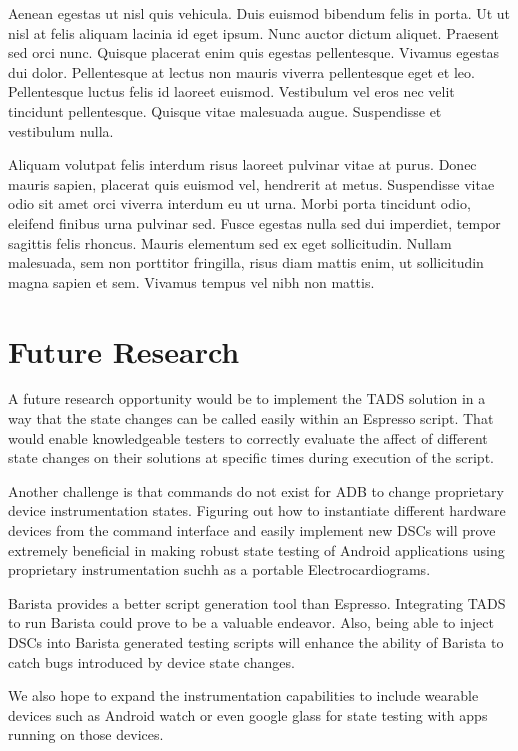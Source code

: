 Aenean egestas ut nisl quis vehicula. Duis euismod bibendum felis in porta. Ut ut nisl at felis aliquam lacinia id eget ipsum. Nunc auctor dictum aliquet. Praesent sed orci nunc. Quisque placerat enim quis egestas pellentesque. Vivamus egestas dui dolor. Pellentesque at lectus non mauris viverra pellentesque eget et leo. Pellentesque luctus felis id laoreet euismod. Vestibulum vel eros nec velit tincidunt pellentesque. Quisque vitae malesuada augue. Suspendisse et vestibulum nulla.

Aliquam volutpat felis interdum risus laoreet pulvinar vitae at purus. Donec mauris sapien, placerat quis euismod vel, hendrerit at metus. Suspendisse vitae odio sit amet orci viverra interdum eu ut urna. Morbi porta tincidunt odio, eleifend finibus urna pulvinar sed. Fusce egestas nulla sed dui imperdiet, tempor sagittis felis rhoncus. Mauris elementum sed ex eget sollicitudin. Nullam malesuada, sem non porttitor fringilla, risus diam mattis enim, ut sollicitudin magna sapien et sem. Vivamus tempus vel nibh non mattis.

\section{Future Research}
A future research opportunity would be to implement the TADS solution in a way that the state changes can be called easily within an Espresso script.  That would enable knowledgeable testers to correctly evaluate the affect of different state changes on their solutions at specific times during execution of the script.   

Another challenge is that commands do not exist for ADB to change proprietary device instrumentation states.  Figuring out how to instantiate different hardware devices from the command interface and easily implement new DSCs will prove extremely beneficial in making robust state testing of Android applications using proprietary instrumentation suchh as a portable Electrocardiograms.  

Barista \cite{7927971} provides a better script generation tool than Espresso.  Integrating TADS to run Barista could prove to be a valuable endeavor.  Also, being able to inject DSCs into Barista generated testing scripts will enhance the ability of Barista to catch bugs introduced by device state changes.  

We also hope to expand the instrumentation capabilities to include wearable devices such as Android watch or even google glass for state testing with apps running on those devices.

